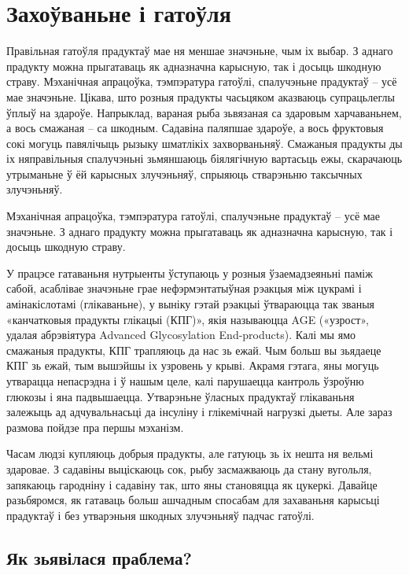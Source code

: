\chapter{Захоўваньне і гатоўля}

Правільная гатоўля прадуктаў мае ня меншае значэньне, чым іх выбар. З аднаго прадукту можна прыгатаваць як адназначна карысную, так і досыць шкодную страву. Мэханічная апрацоўка, тэмпэратура гатоўлі, спалучэньне прадуктаў – усё мае значэньне. Цікава, што розныя прадукты часьцяком аказваюць супрацьлеглы ўплыў на здароўе. Напрыклад, вараная рыба зьвязаная са здаровым харчаваньнем, а вось смажаная – са шкодным. Садавіна паляпшае здароўе, а вось фруктовыя сокі могуць павялічыць рызыку шматлікіх захворваньняў. Смажаныя прадукты ды іх няправільныя спалучэньні зьмяншаюць біялягічную вартасьць ежы, скарачаюць утрыманьне ў ёй карысных злучэньняў, спрыяюць стварэньню таксычных злучэньняў.

Мэханічная апрацоўка, тэмпэратура гатоўлі, спалучэньне прадуктаў – усё мае значэньне. З аднаго прадукту можна прыгатаваць як адназначна карысную, так і досыць шкодную страву.

У працэсе гатаваньня нутрыенты ўступаюць у розныя ўзаемадзеяньні паміж сабой, асаблівае значэньне грае нефэрмэнтатыўная рэакцыя між цукрамі і амінакіслотамі (глікаваньне), у выніку гэтай рэакцыі ўтвараюцца так званыя «канчатковыя прадукты глікацыі (КПГ)», якія называюцца AGE («узрост», удалая абрэвіятура Advanced Glycosylation End-products). Калі мы ямо смажаныя прадукты, КПГ трапляюць да нас зь ежай. Чым больш вы зьядаеце КПГ зь ежай, тым вышэйшы іх узровень у крыві. Акрамя гэтага, яны могуць утварацца непасрэдна і ў нашым целе, калі парушаецца кантроль ўзроўню глюкозы і яна падвышаецца. Утварэньне ўласных прадуктаў глікаваньня залежыць ад адчувальнасьці да інсуліну і глікемічнай нагрузкі дыеты. Але зараз размова пойдзе пра першы мэханізм.

Часам людзі купляюць добрыя прадукты, але гатуюць зь іх нешта ня вельмі здаровае. З садавіны выціскаюць сок, рыбу засмажваюць да стану вугольля, запякаюць гародніну і садавіну так, што яны становяцца як цукеркі. Давайце разьбяромся, як гатаваць больш ашчадным спосабам для захаваньня карысьці прадуктаў і без утварэньня шкодных злучэньняў падчас гатоўлі.

\section{Як зьявілася праблема?}

